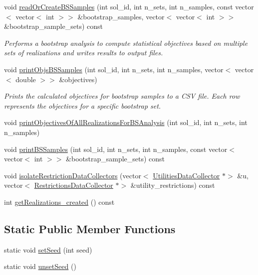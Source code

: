 \begin{DoxyCompactItemize}
void \mbox{\hyperlink{classMasterDataCollector_a4d87af61c1a0894574a02f944a4f78d6}{read\+Or\+Create\+B\+S\+Samples}} (int sol\+\_\+id, int n\+\_\+sets, int n\+\_\+samples, const vector$<$ vector$<$ int $>$$>$ \&bootstrap\+\_\+samples, vector$<$ vector$<$ int $>$$>$ \&bootstrap\+\_\+sample\+\_\+sets) const
\begin{DoxyCompactList}\small\item\em Performs a bootstrap analysis to compute statistical objectives based on multiple sets of realizations and writes results to output files. \end{DoxyCompactList}\item 
void \mbox{\hyperlink{classMasterDataCollector_a0832afc87f9da7f7b1a70866e4ee4c6d}{print\+Objs\+B\+S\+Samples}} (int sol\+\_\+id, int n\+\_\+sets, int n\+\_\+samples, vector$<$ vector$<$ double $>$$>$ \&objectives)
\begin{DoxyCompactList}\small\item\em Prints the calculated objectives for bootstrap samples to a C\+SV file. Each row represents the objectives for a specific bootstrap set. \end{DoxyCompactList}\item 
void \mbox{\hyperlink{classMasterDataCollector_a03f0a7bdc1502cbe23905dbfc48e6546}{print\+Objectives\+Of\+All\+Realizations\+For\+B\+S\+Analysis}} (int sol\+\_\+id, int n\+\_\+sets, int n\+\_\+samples)
\item 
void \mbox{\hyperlink{classMasterDataCollector_a458ff4ee13e7cce91aee043b65c7c443}{print\+B\+S\+Samples}} (int sol\+\_\+id, int n\+\_\+sets, int n\+\_\+samples, const vector$<$ vector$<$ int $>$$>$ \&bootstrap\+\_\+sample\+\_\+sets) const
\item 
void \mbox{\hyperlink{classMasterDataCollector_a640eed0cb3e00679463601adbdd3d1e6}{isolate\+Restriction\+Data\+Collectors}} (vector$<$ \mbox{\hyperlink{classUtilitiesDataCollector}{Utilities\+Data\+Collector}} $\ast$$>$ \&u, vector$<$ \mbox{\hyperlink{classRestrictionsDataCollector}{Restrictions\+Data\+Collector}} $\ast$$>$ \&utility\+\_\+restrictions) const
\item 
int \mbox{\hyperlink{classMasterDataCollector_afa654d3fbf2e86692d3ccedf891265b1}{get\+Realizations\+\_\+created}} () const
\end{DoxyCompactItemize}
\subsection*{Static Public Member Functions}
\begin{DoxyCompactItemize}
\item 
static void \mbox{\hyperlink{classMasterDataCollector_a822c758d5e729fdd70d93b8c88b138e4}{set\+Seed}} (int seed)
\item 
static void \mbox{\hyperlink{classMasterDataCollector_ade426952ec26ca85a724075f617e6454}{unset\+Seed}} ()
\end{DoxyCompactItemize}



